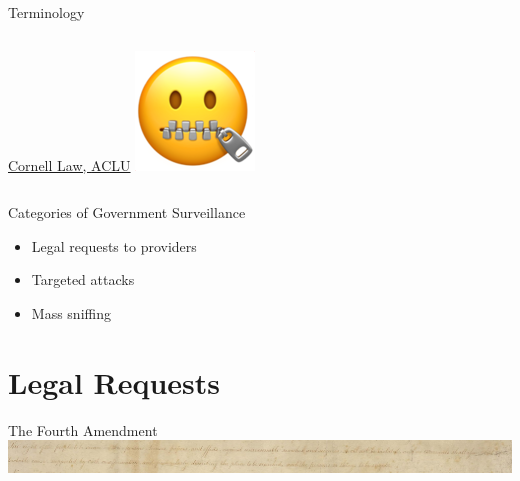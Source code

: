 \documentclass[nobackground,dvipsnames,table,aspectratio=169]{beamer}
\begin{document}
\begin{frame}{Terminology}
\begin{columns}[T]
            \scriptsize
            \href{https://www.law.cornell.edu/wex/surveillance}{Cornell Law, }\href{https://www.aclu.org/other/what-censorship}{ACLU}
            \includegraphics[width=\textwidth]{zipped}
    \end{columns}
\end{frame}

\begin{frame}{Categories of Government Surveillance}
    \Large
    \begin{itemize}
        \item Legal requests to providers
        \item Targeted attacks
        \item Mass sniffing
    \end{itemize}
\end{frame}

\section{Legal Requests}

\begin{frame}{The Fourth Amendment}
    \centering
    \includegraphics[width=\textwidth]{4th-amendment}
\end{frame}
\end{document}
